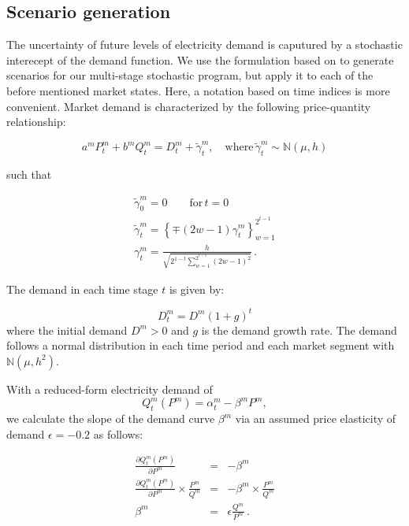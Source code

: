 \subsection{Scenario generation}
\label{sec:scenario-generation}

The uncertainty of future levels of electricity demand is caputured by a stochastic interecept of the demand function. We use the formulation based on \cite{Genc2007} to generate scenarios for our multi-stage stochastic program, but apply it to each of the before mentioned market states. Here, a notation based on time indices is more convenient. Market demand is characterized by the following price-quantity relationship:

\begin{equation}
  \label{eq:marketdemandpq}
  a^mP^m_t+b^mQ^m_t=D^m_t+\tilde{\gamma}^m_t, \quad \mbox{where}\, \tilde{\gamma}^m_t\sim\mathbb{N}(\mu,h)
\end{equation}

such that

\begin{eqnarray*}
  \label{eq:3}
  \tilde{\gamma}^m_0=0\qquad\mbox{for}\, t=0\\
   \tilde{\gamma}^m_t=\left\{\mp(2w-1)\gamma^m_t\right\}_{w=1}^{2^{t-1}}\\
   \gamma^m_t=\frac{h}{\sqrt{2^{1-t}\sum_{w=1}^{2^{t-1}}(2w-1)^2}}\,.
\end{eqnarray*}

The demand in each time stage $t$ is given by:

\begin{equation}
  \label{eq:demandgrowth}
  D^m_t = D^m(1+g)^t
\end{equation}
where the initial demand $D^m>0$ and $g$ is the demand growth rate. The demand follows a normal distribution in each time period and each market segment with $\mathbb{N}(\mu, h^2)$.

With a reduced-form electricity demand of
\begin{equation}
  \label{eq:5}
  Q^m_t(P^m) = \alpha^m_t-\beta^m P^m, 
\end{equation}
we calculate the slope of the demand curve $\beta^m$  via an assumed price elasticity of demand $\epsilon=-0.2$ as follows:

\begin{eqnarray*}
  \frac{\partial Q^m_t(P^m)}{\partial P^m} &=& -\beta^m \\
  \frac{\partial Q^m_t(P^m)}{\partial P^m}\times\frac{P^m}{Q^m} &=& -\beta^m\times\frac{P^m}{Q^m} \\
\beta^m &=& \epsilon\frac{Q^m}{P^m}\,.
\end{eqnarray*}


